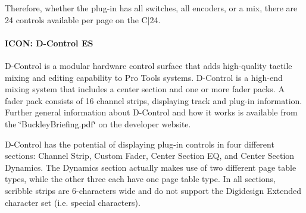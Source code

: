 Therefore, whether the plug-\/in has all switches, all encoders, or a mix, there are 24 controls available per page on the C$\vert$24.

\hypertarget{a00363_subsubsection__icon_dcontrol_es_}{}\paragraph{I\+C\+O\+N\+: D-\/\+Control E\+S}\label{a00363_subsubsection__icon_dcontrol_es_}
 D-\/\+Control is a modular hardware control surface that adds high-\/quality tactile mixing and editing capability to Pro Tools systems. D-\/\+Control is a high-\/end mixing system that includes a center section and one or more fader packs. A fader pack consists of 16 channel strips, displaying track and plug-\/in information. Further general information about D-\/\+Control and how it works is available from the \char`\"{}\+Buckley\+Briefing.\+pdf\char`\"{} on the developer website.

D-\/\+Control has the potential of displaying plug-\/in controls in four different sections\+: Channel Strip, Custom Fader, Center Section E\+Q, and Center Section Dynamics. The Dynamics section actually makes use of two different page table types, while the other three each have one page table type. In all sections, scribble strips are 6-\/characters wide and do not support the Digidesign Extended character set (i.\+e. special characters).


